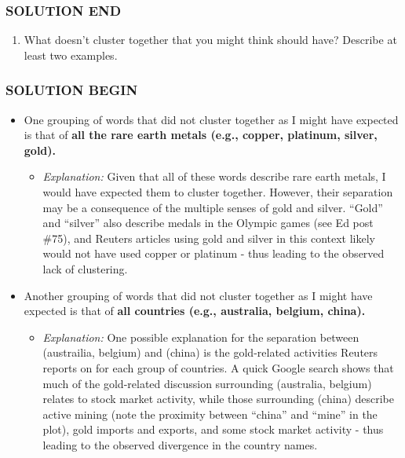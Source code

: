 \documentclass[11pt]{article}
\providecommand{\tightlist}{%
      \setlength{\itemsep}{0pt}\setlength{\parskip}{0pt}}
\begin{document}
\hypertarget{solution-end}{%
\subsubsection{SOLUTION END}\label{solution-end}}

    \begin{enumerate}
\def\labelenumi{\alph{enumi}.}
\setcounter{enumi}{1}
\tightlist
\item
  What doesn't cluster together that you might think should have?
  Describe at least two examples.
\end{enumerate}

    \hypertarget{solution-begin}{%
\subsubsection{SOLUTION BEGIN}\label{solution-begin}}

\begin{itemize}
\tightlist
\item
  One grouping of words that did not cluster together as I might have
  expected is that of \textbf{all the rare earth metals (e.g., copper,
  platinum, silver, gold).}

  \begin{itemize}
  \tightlist
  \item
    \emph{Explanation:} Given that all of these words describe rare
    earth metals, I would have expected them to cluster together.
    However, their separation may be a consequence of the multiple
    senses of gold and silver. ``Gold'' and ``silver'' also describe
    medals in the Olympic games (see Ed post \#75), and Reuters articles
    using gold and silver in this context likely would not have used
    copper or platinum - thus leading to the observed lack of
    clustering.
  \end{itemize}
\item
  Another grouping of words that did not cluster together as I might
  have expected is that of \textbf{all countries (e.g., australia,
  belgium, china).}

  \begin{itemize}
  \tightlist
  \item
    \emph{Explanation:} One possible explanation for the separation
    between (austrailia, belgium) and (china) is the gold-related
    activities Reuters reports on for each group of countries. A quick
    Google search shows that much of the gold-related discussion
    surrounding (australia, belgium) relates to stock market activity,
    while those surrounding (china) describe active mining (note the
    proximity between ``china'' and ``mine'' in the plot), gold imports
    and exports, and some stock market activity - thus leading to the
    observed divergence in the country names.
  \end{itemize}
\end{itemize}
\end{document}
